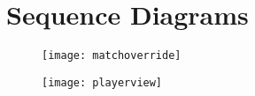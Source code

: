 \documentclass{article}
\begin{document}
\section*{Sequence Diagrams}

\begin{figure}[!ht]
  \centering
    \texttt{[image: matchoverride]}
\end{figure}

\begin{figure}[!ht]
  \centering
    \texttt{[image: playerview]}
\end{figure}
\end{document}
